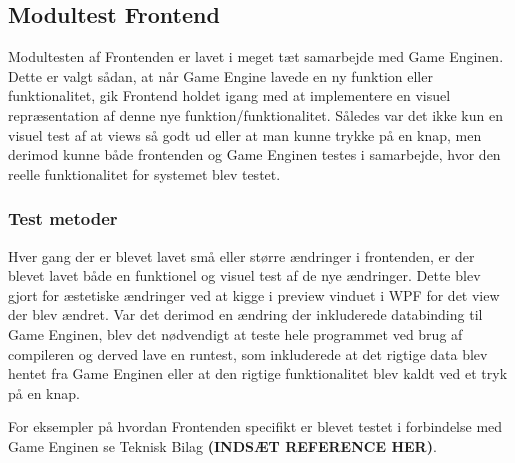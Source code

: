 \subsection{Modultest Frontend}
Modultesten af Frontenden er lavet i meget tæt samarbejde med Game Enginen. Dette er valgt sådan, at når Game Engine lavede en ny funktion eller funktionalitet, gik Frontend holdet igang med at implementere en visuel repræsentation af denne nye funktion/funktionalitet. Således var det ikke kun en visuel test af at views så godt ud eller at man kunne trykke på en knap, men derimod kunne både frontenden og Game Enginen testes i samarbejde, hvor den reelle funktionalitet for systemet blev testet.

\subsubsection{Test metoder}
Hver gang der er blevet lavet små eller større ændringer i frontenden, er der blevet lavet både en funktionel og visuel test af de nye ændringer. Dette blev gjort for æstetiske ændringer ved at kigge i preview vinduet i WPF for det view der blev ændret. Var det derimod en ændring der inkluderede databinding til Game Enginen, blev det nødvendigt at teste hele programmet ved brug af compileren og derved lave en runtest, som inkluderede at det rigtige data blev hentet fra Game Enginen eller at den rigtige funktionalitet blev kaldt ved et tryk på en knap.

\noindent For eksempler på hvordan Frontenden specifikt er blevet testet i forbindelse med Game Enginen se Teknisk Bilag \textbf{(INDSÆT REFERENCE HER)}.